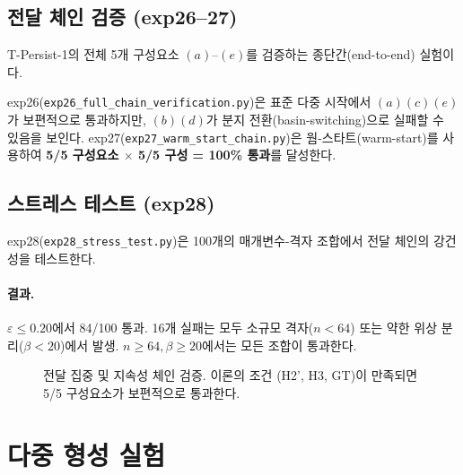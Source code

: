 \subsection{전달 체인 검증 (exp26--27)}

T-Persist-1의 전체 5개 구성요소 $(a)$--$(e)$를 검증하는 종단간(end-to-end) 실험이다.

exp26(\texttt{exp26\_full\_chain\_verification.py})은 표준 다중 시작에서 $(a)(c)(e)$가 보편적으로 통과하지만, $(b)(d)$가 분지 전환(basin-switching)으로 실패할 수 있음을 보인다. exp27(\texttt{exp27\_warm\_start\_chain.py})은 웜-스타트(warm-start)를 사용하여 \textbf{5/5 구성요소 $\times$ 5/5 구성 = 100\% 통과}를 달성한다.

\subsection{스트레스 테스트 (exp28)}

exp28(\texttt{exp28\_stress\_test.py})은 100개의 매개변수-격자 조합에서 전달 체인의 강건성을 테스트한다.

\paragraph{결과.} $\varepsilon \leq 0.20$에서 84/100 통과. 16개 실패는 모두 소규모 격자($n < 64$) 또는 약한 위상 분리($\beta < 20$)에서 발생. $n \geq 64, \beta \geq 20$에서는 모든 조합이 통과한다.

\begin{figure}[t]
\centering
{}
\caption{전달 집중 및 지속성 체인 검증. 이론의 조건 (H2', H3, GT)이 만족되면 5/5 구성요소가 보편적으로 통과한다.}
\label{fig:transport-verification}
\end{figure}


\section{다중 형성 실험}
\label{sec:exp-multi}

